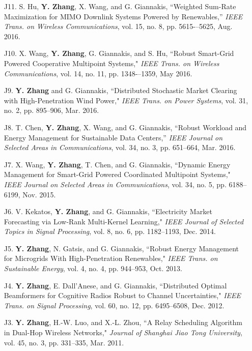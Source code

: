 \documentclass[margin,line]{res}
\begin{document}
\begin{resume}
\begin{enumerate}
\item[J11.] S. Hu, \textbf{Y. Zhang}, X. Wang, and G. Giannakis,
``Weighted Sum-Rate Maximization for MIMO Downlink Systems Powered by Renewables,''
\emph{IEEE Trans. on Wireless Communications}, vol. 15, no. 8, pp. 5615-–5625, Aug. 2016.


\item[J10.] X. Wang, \textbf{Y. Zhang}, G. Giannakis, and S. Hu,
``Robust Smart-Grid Powered Cooperative Multipoint Systems,"
\emph{IEEE Trans. on Wireless Communications}, vol. 14, no. 11, pp. 1348-–1359, May 2016.


\item[J9.] \textbf{Y. Zhang} and G. Giannakis,
``Distributed Stochastic Market Clearing with High-Penetration Wind Power,"
\emph{IEEE Trans. on Power Systems}, vol. 31, no. 2, pp. 895--906, Mar. 2016.


\item[J8.] T. Chen, \textbf{Y. Zhang}, X. Wang, and G. Giannakis,
``Robust Workload and Energy Management for Sustainable Data Centers,''
\emph{IEEE Journal on Selected Areas in Communications}, vol. 34, no. 3, pp. 651--664, Mar. 2016.


\item[J7.]	X. Wang, \textbf{Y. Zhang}, T. Chen, and G. Giannakis,
``Dynamic Energy Management for Smart-Grid Powered Coordinated Multipoint Systems,"
\emph{IEEE Journal on Selected Areas in Communications}, vol. 34, no. 5, pp. 6188--6199, Nov. 2015.


\item[J6.] V. Kekatos, \textbf{Y. Zhang}, and G. Giannakis,
``Electricity Market Forecasting via Low-Rank Multi-Kernel Learning,"
\emph{IEEE Journal of Selected Topics in Signal Processing}, vol. 8, no. 6, pp. 1182--1193, Dec. 2014.

\item[J5.]	\textbf{Y. Zhang}, N. Gatsis, and G. Giannakis,
``Robust Energy Management for Microgrids With High-Penetration Renewables,"
\emph{IEEE Trans. on Sustainable Energy}, vol. 4, no. 4, pp. 944--953, Oct. 2013.

\item[J4.]	\textbf{Y. Zhang}, E. Dall'Anese, and G. Giannakis,
``Distributed Optimal Beamformers for Cognitive Radios Robust to Channel Uncertainties,"
\emph{IEEE Trans. on Signal Processing}, vol. 60, no. 12, pp. 6495--6508, Dec. 2012.

\item[J3.]	\textbf{Y. Zhang}, H.-W. Luo, and X.-L. Zhou,
``A Relay Scheduling Algorithm in Dual-Hop Wireless Networks,"
\emph{Journal of Shanghai Jiao Tong University}, vol. 45, no. 3, pp. 331--335, Mar. 2011.


\end{enumerate}
\end{resume}
\end{document}

